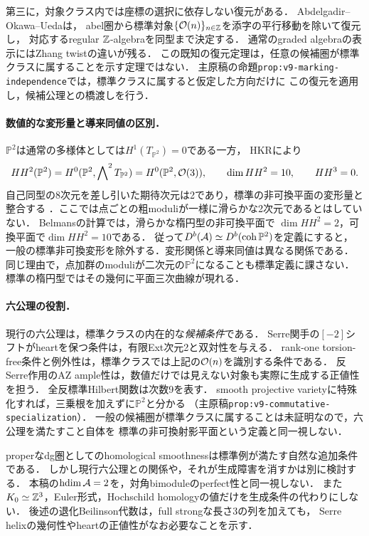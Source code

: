 \documentclass[11pt,a4paper]{ltjsarticle}
\begin{document}
第三に，対象クラス内では座標の選択に依存しない復元がある．
Abdelgadir--Okawa--Ueda\cite[Theorem 7.3, Appendix A]{AOUCompact}は，
abel圏から標準対象$\{\mathcal O(n)\}_{n\in\mathbb Z}$を添字の平行移動を除いて復元し，
対応するregular $\mathbb Z$-algebraを同型まで決定する．
通常のgraded algebraの表示にはZhang twistの違いが残る．
この既知の復元定理は，任意の候補圏が標準クラスに属することを示す定理ではない．
主原稿の命題\texttt{prop:v9-marking-independence}では，標準クラスに属すると仮定した方向だけに
この復元を適用し，候補公理との橋渡しを行う．

\paragraph{数値的な変形量と導来同値の区別．}
$\mathbb P^2$は通常の多様体としては$H^1(T_{\mathbb P^2})=0$である一方，
HKRにより
\[
 HH^2(\mathbb P^2)=H^0(\mathbb P^2,\mathop{\bigwedge}\nolimits^2T_{\mathbb P^2})
 =H^0(\mathbb P^2,\mathcal O(3)),\qquad \dim HH^2=10,
 \qquad HH^3=0.
\]
自己同型の8次元を差し引いた期待次元は2であり，標準の非可換平面の変形量と整合する
\cite[Introduction]{VdBquad}．ここでは点ごとの粗moduliが一様に滑らかな2次元であるとはしていない．
Belmans\cite[Table 1]{BelmansHHPlanes}の計算では，滑らかな楕円型の非可換平面で
$\dim HH^2=2$，可換平面で$\dim HH^2=10$である．
従って$D^b(\mathcal A)\simeq D^b(\operatorname{coh}\mathbb P^2)$を定義にすると，
一般の標準非可換変形を除外する．変形関係と導来同値は異なる関係である．
同じ理由で，点加群のmoduliが二次元の$\mathbb P^2$になることも標準定義に課さない．
標準の楕円型ではその幾何に平面三次曲線が現れる\cite[\S7.1--7.2]{AOUCompact}．

\paragraph{六公理の役割．}
現行の六公理は，標準クラスの内在的な\emph{候補条件}である．
Serre関手の$[-2]$シフトがheartを保つ条件は，有限Ext次元2と双対性を与える．
rank-one torsion-free条件と例外性は，標準クラスでは上記の$\mathcal O(n)$を識別する条件である．
反Serre作用のAZ ample性は，数値だけでは見えない対象も実際に生成する正値性を担う．
全反標準Hilbert関数は次数9を表す．
smooth projective varietyに特殊化すれば，三乗根を加えずに$\mathbb P^2$と分かる
（主原稿\texttt{prop:v9-commutative-specialization}）．
一般の候補圏が標準クラスに属することは未証明なので，六公理を満たすこと自体を
標準の非可換射影平面という定義と同一視しない．

properなdg圏としてのhomological smoothnessは標準例が満たす自然な追加条件である．
しかし現行六公理との関係や，それが生成障害を消すかは別に検討する．
本稿の$\operatorname{hdim}\mathcal A=2$を，対角bimoduleのperfect性と同一視しない．
また$K_0\simeq\mathbb Z^3$，Euler形式，Hochschild homologyの値だけを生成条件の代わりにしない．
後述の退化Beilinson代数は，full strongな長さ3の列を加えても，
Serre helixの幾何性やheartの正値性がなお必要なことを示す．
\end{document}
